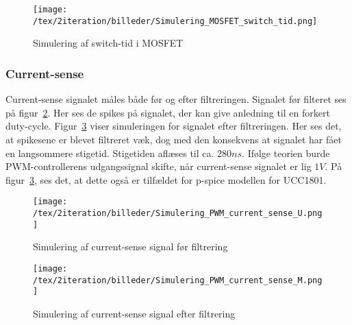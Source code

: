 \begin{figure}[H]
	\center
	\texttt{[image: /tex/2iteration/billeder/Simulering\_MOSFET\_switch\_tid.png]}
	\caption{Simulering af switch-tid i MOSFET}
	\label{fig:Simulering_MOSFET_switch_tid}
\end{figure}


\subsubsection{Current-sense}
\noindent Current-sense signalet måles både før og efter filtreringen. Signalet før filteret ses på figur~\ref{fig:Simulering_PWM_current_sense_U}. Her ses de spikes på signalet, der kan give anledning til en forkert duty-cycle. Figur~\ref{fig:Simulering_PWM_current_sense_M} viser simuleringen for signalet efter filtreringen. Her ses det, at spikesene er blevet filtreret væk, dog med den konsekvens at signalet har fået en langsommere stigetid. Stigetiden aflæses til ca. $280ns$. Ifølge teorien burde PWM-controllerens udgangssignal skifte, når current-sense signalet er lig $1V$. På figur~\ref{fig:Simulering_PWM_current_sense_M}, ses det, at dette også er tilfældet for p-spice modellen for UCC1801. 


\begin{figure}[H]
	\center
	\texttt{[image: /tex/2iteration/billeder/Simulering\_PWM\_current\_sense\_U.png]}
	\caption{Simulering af current-sense signal før filtrering}
	\label{fig:Simulering_PWM_current_sense_U}
\end{figure}

\begin{figure}[H]
	\center
	\texttt{[image: /tex/2iteration/billeder/Simulering\_PWM\_current\_sense\_M.png]}
	\caption{Simulering af current-sense signal efter filtrering}
	\label{fig:Simulering_PWM_current_sense_M}
\end{figure}


